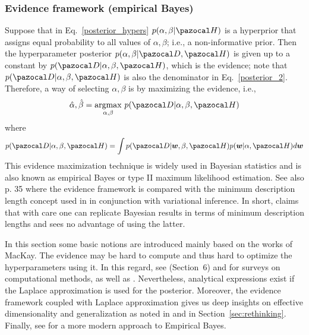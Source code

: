 \subsubsection{Evidence framework (empirical Bayes)}\label{sec:evidence}

Suppose that in Eq.~\eqref{posterior_hypers} $p(\alpha, \beta|\cH)$ is a hyperprior that assigns equal probability to all values of $\alpha, \beta$; i.e., a non-informative prior. 
Then the hyperparameter posterior $p(\alpha, \beta|\cD,\cH)$ is given up to a constant by $p(\cD|\alpha, \beta,\cH)$, which is the evidence; note that $p(\cD|\alpha, \beta,\cH)$ is also the denominator in Eq.~\eqref{posterior_2}. 
Therefore, a way of selecting $\alpha, \beta$ is by maximizing the evidence, i.e.,  
\begin{equation}\label{evidence_max}
\hat{\alpha}, \hat{\beta} = \underset{\alpha, \beta}{\mathrm{argmax}}~p(\cD|\alpha, \beta,\cH)
\end{equation}
where 
\begin{equation}\label{evidence}
p(\cD|\alpha, \beta,\cH) = \int p(\cD|\bw,\beta,\cH)p(\bw|\alpha,\cH) d\bw
\end{equation}
This evidence maximization technique is widely used in Bayesian statistics and is also known as empirical Bayes or type II maximum likelihood estimation. 
See also \textcite{mackay1995probable} p. 35 where the evidence framework is compared with the minimum description length concept used in \textcite{hinton1993keeping} in conjunction with variational inference.
In short, \textcite{mackay1995probable} claims that with care one can replicate Bayesian results in terms of minimum description lengths and sees no advantage of using the latter. 

In this section some basic notions are introduced mainly based on the works of MacKay. 
The evidence may be hard to compute and thus hard to optimize the hyperparameters using it.
In this regard, see \textcite{neal1993probabilistic} (Section~6) and \textcite{robert2009computational} for surveys  on computational methods, as well as \textcite{sohl-dickstein2012hamiltonian}. 
Nevertheless, analytical expressions exist if the Laplace approximation is used for the posterior. 
Moreover, the evidence framework coupled with Laplace approximation gives us deep insights on effective dimensionality and generalization as noted in \textcite{maddox2020rethinking} and in Section~\ref{sec:rethinking}.
Finally, see \textcite{krishnan2019specifying} for a more modern approach to Empirical Bayes.

